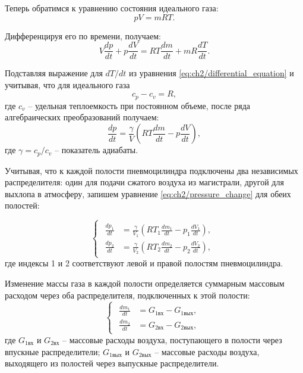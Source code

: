 Теперь обратимся к уравнению состояния идеального газа:
\begin{equation}
\label{eq:ch2/ideal_gas_equation}
    pV = mRT.
\end{equation}

Дифференцируя его по времени, получаем:
\begin{equation}
\label{eq:ch2/ideal_gas_differential}
    V\frac{dp}{dt} + p\frac{dV}{dt} = RT\frac{dm}{dt} + mR\frac{dT}{dt}.
\end{equation}

Подставляя выражение для $dT/dt$ из уравнения \eqref{eq:ch2/differential_equation} и учитывая, что для идеального газа
\begin{equation}
\label{eq:ch2/specific_heat_difference}
    c_p - c_v = R,
\end{equation}
где $c_v$ -- удельная теплоемкость при постоянном объеме, после ряда алгебраических преобразований получаем:
\begin{equation}
\label{eq:ch2/pressure_change}
    \frac{dp}{dt} = \frac{\gamma}{V}\left(RT\frac{dm}{dt} - p\frac{dV}{dt}\right),
\end{equation}
где $\gamma = c_p/c_v$ -- показатель адиабаты.

Учитывая, что к каждой полости пневмоцилиндра подключены два независимых распределителя:
один для подачи сжатого воздуха из магистрали, другой для выхлопа в атмосферу,
запишем уравнение \eqref{eq:ch2/pressure_change} для обеих полостей:

\begin{equation}
\label{eq:ch2/pressure_system}
    \begin{cases}
        \begin{aligned}
            \frac{dp_1}{dt} & = \frac{\gamma}{V_1}\left(RT_1\frac{dm_1}{dt} - p_1\frac{dV_1}{dt}\right), \\
            \frac{dp_2}{dt} & = \frac{\gamma}{V_2}\left(RT_2\frac{dm_2}{dt} - p_2\frac{dV_2}{dt}\right),
        \end{aligned}
    \end{cases}
\end{equation}
где индексы 1 и 2 соответствуют левой и правой полостям пневмоцилиндра.

Изменение массы газа в каждой полости определяется суммарным массовым
расходом через оба распределителя, подключенных к этой полости:
\begin{equation}
\label{eq:ch2/mass_change}
    \begin{cases}
        \begin{aligned}
            \frac{dm_1}{dt} & = G_{1\text{вх}} - G_{1\text{вых}}, \\
            \frac{dm_2}{dt} & = G_{2\text{вх}} - G_{2\text{вых}},
        \end{aligned}
    \end{cases}
\end{equation}
где $G_{1\text{вх}}$ и $G_{2\text{вх}}$ -- массовые расходы воздуха, поступающего в полости через впускные распределители;
$G_{1\text{вых}}$ и $G_{2\text{вых}}$ -- массовые расходы воздуха, выходящего из полостей через выпускные распределители.


